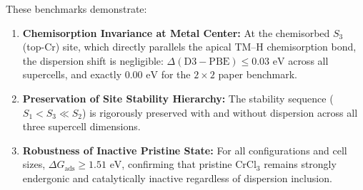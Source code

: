 \documentclass[11pt, sans, a4paper]{moderncv}
\begin{document}
\begin{center}
\small
{}
\end{center}

These benchmarks demonstrate:
\begin{enumerate}[leftmargin=1.5em, itemsep=0.2em]
\item \textbf{Chemisorption Invariance at Metal Center:} At the chemisorbed $S_3$ (top-Cr) site, which directly parallels the apical TM--H chemisorption bond, the dispersion shift is negligible: $\Delta(\text{D3}-\text{PBE}) \le 0.03\text{ eV}$ across all supercells, and exactly $0.00\text{ eV}$ for the $2\times 2$ paper benchmark.
\item \textbf{Preservation of Site Stability Hierarchy:} The stability sequence ($S_1 < S_3 \ll S_2$) is rigorously preserved with and without dispersion across all three supercell dimensions.
\item \textbf{Robustness of Inactive Pristine State:} For all configurations and cell sizes, $\Delta G_{\mathrm{ads}} \ge 1.51\text{ eV}$, confirming that pristine $\text{CrCl}_3$ remains strongly endergonic and catalytically inactive regardless of dispersion inclusion.
\end{enumerate}
\end{document}
